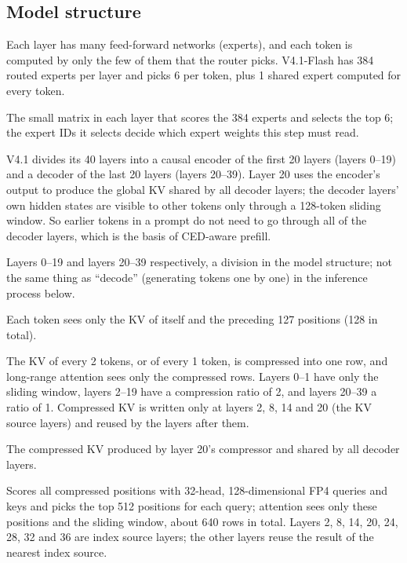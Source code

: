 \documentclass[11pt,a4paper]{article}
\begin{document}
\subsection*{Model structure}
\begin{description}\small
  \item[MoE (mixture of experts)] Each layer has many feed-forward networks (experts), and each token is computed by only the few of them that the router picks. V4.1-Flash has 384 routed experts per layer and picks 6 per token, plus 1 shared expert computed for every token.
  \item[Router (gate)] The small matrix in each layer that scores the 384 experts and selects the top 6; the expert IDs it selects decide which expert weights this step must read.
  \item[CED (encoder-decoder structure)] V4.1 divides its 40 layers into a causal encoder of the first 20 layers (layers 0--19) and a decoder of the last 20 layers (layers 20--39). Layer 20 uses the encoder's output to produce the global KV shared by all decoder layers; the decoder layers' own hidden states are visible to other tokens only through a 128-token sliding window. So earlier tokens in a prompt do not need to go through all of the decoder layers, which is the basis of CED-aware prefill.
  \item[Encoder layers, decoder layers] Layers 0--19 and layers 20--39 respectively, a division in the model structure; not the same thing as ``decode'' (generating tokens one by one) in the inference process below.
  \item[Sliding-window attention (SWA)] Each token sees only the KV of itself and the preceding 127 positions (128 in total).
  \item[Compressed attention, compression ratio] The KV of every 2 tokens, or of every 1 token, is compressed into one row, and long-range attention sees only the compressed rows. Layers 0--1 have only the sliding window, layers 2--19 have a compression ratio of 2, and layers 20--39 a ratio of 1. Compressed KV is written only at layers 2, 8, 14 and 20 (the KV source layers) and reused by the layers after them.
  \item[Global KV] The compressed KV produced by layer 20's compressor and shared by all decoder layers.
  \item[Sparse indexer (lightning indexer)] Scores all compressed positions with 32-head, 128-dimensional FP4 queries and keys and picks the top 512 positions for each query; attention sees only these positions and the sliding window, about 640 rows in total. Layers 2, 8, 14, 20, 24, 28, 32 and 36 are index source layers; the other layers reuse the result of the nearest index source.

\end{description}
\end{document}
